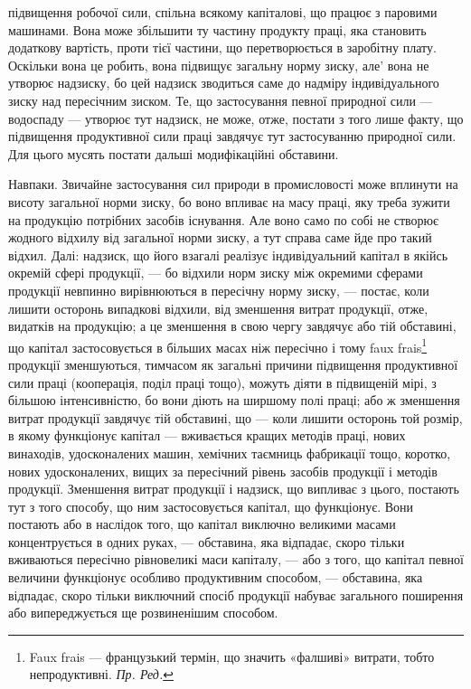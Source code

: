 \parcont{}  %
підвищення робочої сили, спільна всякому капіталові, що працює з паровими
машинами. Вона може збільшити ту частину продукту праці, яка становить
додаткову вартість, проти тієї частини, що перетворюється в заробітну плату.
Оскільки вона це робить, вона підвищує загальну норму зиску, але' вона не
утворює надзиску, бо цей надзиск зводиться саме до надміру індивідуального
зиску над пересічним зиском. Те, що застосування певної природної сили — водоспаду
— утворює тут надзиск, не може, отже, постати з того лише факту, що
підвищення продуктивної сили праці завдячує тут застосуванню природної сили.
Для цього мусять постати дальші модифікаційні обставини.

Навпаки. Звичайне застосування сил природи в промисловості може вплинути
на висоту загальної норми зиску, бо воно впливає на масу праці, яку
треба зужити на продукцію потрібних засобів існування. Але воно само по собі не
створює жодного відхилу від загальної норми зиску, а тут справа саме йде
про такий відхил. Далі: надзиск, що його взагалі реалізує індивідуальний капітал
в якійсь окремій сфері продукції, — бо відхили норм зиску між окремими сферами
продукції невпинно вирівнюються в пересічну норму зиску, — постає, коли лишити
осторонь випадкові відхили, від зменшення витрат продукції, отже, видатків на
продукцію; а це зменшення в свою чергу завдячує або тій обставині, що
капітал застосовується в більших масах ніж пересічно і тому faux frais\footnote*{
Faux frais — французький термін, що значить «фалшиві» витрати, тобто непродуктивні. \emph{Пр. Ред.}
}
продукції зменшуються, тимчасом як загальні причини підвищення продуктивної
сили праці (кооперація, поділ праці тощо), можуть діяти в підвищеній мірі, з
більшою інтенсивністю, бо вони діють на ширшому полі праці; або ж зменшення
витрат продукції завдячує тій обставині, що — коли лишити осторонь той розмір,
в якому функціонує капітал — вживається кращих методів праці, нових винаходів,
удосконалених машин, хемічних таємниць фабрикації тощо, коротко, нових
удосконалених, вищих за пересічний рівень засобів продукції і методів продукції.
Зменшення витрат продукції і надзиск, що випливає з цього, постають тут
з того способу, що ним застосовується капітал, що функціонує. Вони постають
або в наслідок того, що капітал виключно великими масами концентрується в
одних руках, — обставина, яка відпадає, скоро тільки вживаються пересічно
рівновеликі маси капіталу, — або з того, що капітал певної величини функціонує
особливо продуктивним способом, — обставина, яка відпадає, скоро тільки
виключний спосіб продукції набуває загального поширення або випереджується
ще розвиненішим способом.


